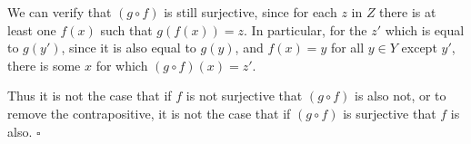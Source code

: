 \documentclass[../../main.tex]{subfiles}
\begin{document}
\begin{enumerate}
\begin{prf}
\begin{center}
    \end{center}

    We can verify that $(g \circ f)$ is still surjective, since for each $z$ in $Z$ there is at least one $f(x)$ such that $g(f(x))=z$.
    In particular, for the $z'$ which is equal to $g(y')$, since it is also equal to $g(y)$, and $f(x)=y$ for all $y \in Y$ except $y'$, there is some $x$ for which $(g \circ f)(x)=z'$.

    Thus it is not the case that if $f$ is not surjective that $(g \circ f)$ is also not, or to remove the contrapositive, it is not the case that if $(g \circ f)$ is surjective that $f$ is also.
    $\square$
\end{prf}
\end{enumerate}

\addtocounter{subsection}{2}
\subsection{}
\end{document}
